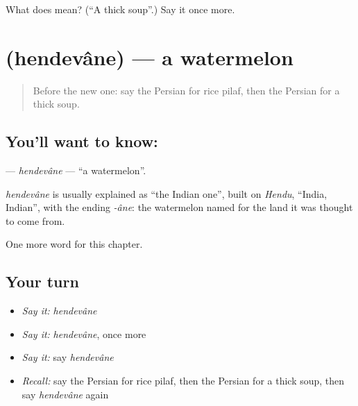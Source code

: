 \begin{tcolorbox}[breakable,colback=teal!4,colframe=teal!35!black,title={Before you move on}]
What does  mean? (\textquotedblleft{}A thick soup\textquotedblright{}.) Say it once more.
\end{tcolorbox}
\section[\texorpdfstring{\fa{هندوانه} (hendevâne)}{هندوانه (hendevâne)}]{ (hendevâne) — a watermelon}

\label{lesson:FA-C99-hendevane}



\begin{quote}
Before the new one: say the Persian for rice pilaf, then the Persian for a thick soup.
\end{quote}

\subsection*{You'll want to know: }
\textbf{} — \emph{hendevâne} — \textquotedblleft{}a watermelon\textquotedblright{}.

\begin{cousinweb}
\emph{hendevâne} is usually explained as \textquotedblleft{}the Indian one\textquotedblright{}, built on \emph{Hendu}, \textquotedblleft{}India, Indian\textquotedblright{}, with the ending \emph{-âne}: the watermelon named for the land it was thought to come from.
\end{cousinweb}

\begin{grammarlens}[title={What you've built}]
One more word for this chapter.
\end{grammarlens}

\subsection*{Your turn}
\begin{itemize}
\raggedright
  \item \emph{Say it:} \emph{hendevâne}
  \item \emph{Say it:} \emph{hendevâne}, once more
  \item \emph{Say it:} say \emph{hendevâne}
  \item \emph{Recall:} say the Persian for rice pilaf, then the Persian for a thick soup, then say \emph{hendevâne} again
\end{itemize}

